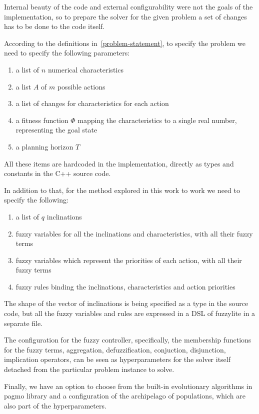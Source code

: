 \documentclass[12pt, a4paper]{report}
\begin{document}
	Internal beauty of the code and external configurability were not the goals of the implementation, so to prepare the solver for the given problem a set of changes has to be done to the code itself.
	
	According to the definitions in~\ref{problem-statement}, to specify the problem we need to specify the following parameters:
	
	\begin{enumerate}
		\item a list of $n$ numerical characteristics
		\item a list $A$ of $m$ possible actions
		\item a list of changes for characteristics for each action
		\item a fitness function $\Phi$ mapping the characteristics to a single real number, representing the goal state
		\item a planning horizon $T$
	\end{enumerate}
	
	All these items are hardcoded in the implementation, directly as types and constants in the C++ source code.
	
	In addition to that, for the method explored in this work to work we need to specify the following:
	
	\begin{enumerate}
		\item a list of $q$ inclinations
		\item fuzzy variables for all the inclinations and characteristics, with all their fuzzy terms
		\item fuzzy variables which represent the priorities of each action, with all their fuzzy terms
		\item fuzzy rules binding the inclinations, characteristics and action priorities
	\end{enumerate}

	The shape of the vector of inclinations is being specified as a type in the source code, but all the fuzzy variables and rules are expressed in a DSL of fuzzylite in a separate file.
	
	The configuration for the fuzzy controller, specifically, the membership functions for the fuzzy terms, aggregation, defuzzification, conjuction, disjunction, implication operators, can be seen as hyperparameters for the solver itself detached from the particular problem instance to solve.
	
	Finally, we have an option to choose from the built-in evolutionary algorithms in pagmo library and a configuration of the archipelago of populations, which are also part of the hyperparameters.
	
\end{document}
